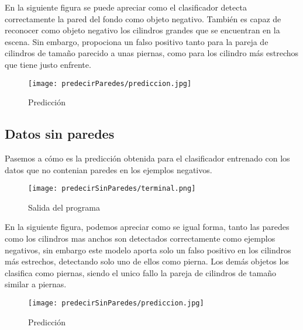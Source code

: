 En la siguiente figura se puede apreciar como el clasificador detecta correctamente la pared del fondo como objeto negativo. También es capaz de reconocer como objeto negativo los cilindros grandes que se encuentran en la escena. Sin embargo, propociona un falso positivo tanto para la pareja de cilindros de tamaño parecido a unas piernas, como para los cilindro más estrechos que tiene justo enfrente.

\begin{figure}[H]
	\centering
	\texttt{[image: predecirParedes/prediccion.jpg]}
	\caption{Predicción}
\end{figure}

\newpage

\subsection{Datos sin paredes}
Pasemos a cómo es la predicción obtenida para el clasificador entrenado con los datos que no contenian paredes en los ejemplos negativos.
\begin{figure}[H]
	\centering
	\texttt{[image: predecirSinParedes/terminal.png]}
	\caption{Salida del programa}
\end{figure}

En la siguiente figura, podemos apreciar como se igual forma, tanto las paredes como los cilindros mas anchos son detectados correctamente como ejemplos negativos, sin embargo este modelo aporta solo un falso positivo en los cilindros más estrechos, detectando solo uno de ellos como pierna. Los demás objetos los clasifica como piernas, siendo el unico fallo la pareja de cilindros de tamaño similar a piernas.

\begin{figure}[H]
	\centering
	\texttt{[image: predecirSinParedes/prediccion.jpg]}
	\caption{Predicción}
\end{figure}
